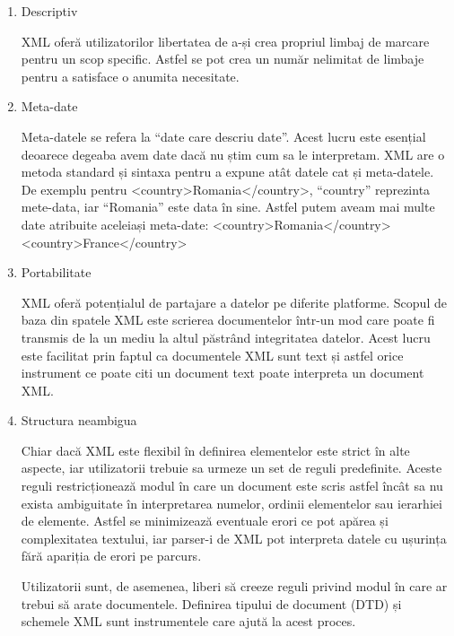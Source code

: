 \begin{enumerate}[wide=0pt, listparindent=1.25em, parsep=1pt]
\item Descriptiv

XML oferă utilizatorilor libertatea de a-și crea propriul limbaj de marcare pentru un scop specific.
Astfel se pot crea un număr nelimitat de limbaje pentru a satisface o anumita necesitate.

\item Meta-date

Meta-datele se refera la “date care descriu date”. 
Acest lucru este esențial deoarece degeaba avem date dacă nu știm cum sa le interpretam. 
XML are o metoda standard și sintaxa pentru a expune atât datele cat și meta-datele. 
De exemplu  pentru <country>Romania</country>, “country” reprezinta mete-data, iar “Romania” este data în sine. 
Astfel putem aveam mai multe date atribuite aceleiași meta-date: 
\newline<country>Romania</country>
\newline<country>France</country>

\item Portabilitate

XML oferă potențialul de partajare a datelor pe diferite platforme. 
Scopul de baza din spatele XML este scrierea documentelor într-un mod care poate fi transmis de la un mediu la altul păstrând 
integritatea datelor. Acest lucru este facilitat prin faptul ca documentele XML sunt text și astfel orice instrument ce poate 
citi un document text poate interpreta un document XML. 

\item Structura neambigua

Chiar dacă XML este flexibil în definirea elementelor este strict în alte aspecte, 
iar utilizatorii trebuie sa urmeze un set de reguli predefinite. 
Aceste reguli restricționează modul în care un document este scris astfel încât sa nu exista ambiguitate în interpretarea numelor, 
ordinii elementelor sau ierarhiei de elemente. Astfel se minimizează eventuale erori ce pot apărea și complexitatea textului, 
iar parser-i de XML pot interpreta datele cu ușurința fără apariția de erori pe parcurs.\newline 

Utilizatorii sunt, de asemenea, liberi să creeze reguli privind modul în care ar trebui să arate documentele.
Definirea tipului de document (DTD) și schemele XML sunt instrumentele care ajută la acest
proces.
\end{enumerate}

